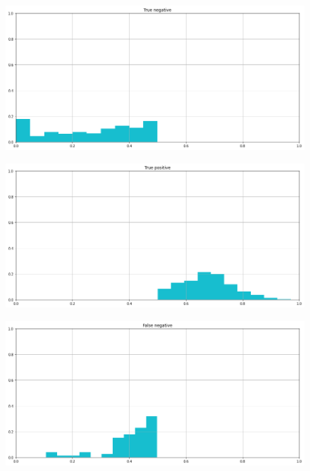 \documentclass[12pt]{report}
\theoremstyle{definition}
\begin{document}
\begin{figure}
\centering
    \begin{minipage}{0.48\textwidth}
     \includegraphics[width=\linewidth]{images/experiment_uniform_sovrapposti/tn.png}\label{tn_us}
   \end{minipage}
   \begin{minipage}{0.48\textwidth}
     \includegraphics[width=\linewidth]{images/experiment_uniform_sovrapposti/tp.png}\label{tp_us}
   \end{minipage}
   \begin{minipage}{0.48\textwidth}
     \includegraphics[width=\linewidth]{images/experiment_uniform_sovrapposti/fn.png}\label{fn_us}

\end{minipage}
\end{figure}
\end{document}
